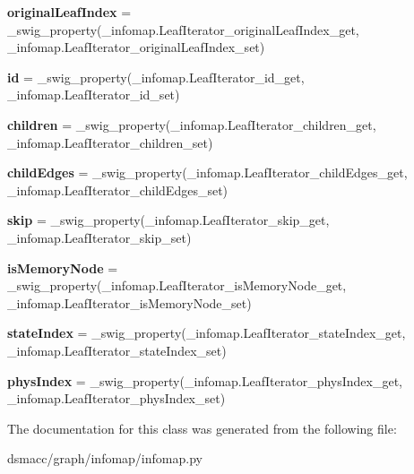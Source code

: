 \begin{DoxyCompactItemize}
{\bfseries original\+Leaf\+Index} = \+\_\+swig\+\_\+property(\+\_\+infomap.\+Leaf\+Iterator\+\_\+original\+Leaf\+Index\+\_\+get, \+\_\+infomap.\+Leaf\+Iterator\+\_\+original\+Leaf\+Index\+\_\+set)
\item 
\mbox{\label{classdsmacc_1_1graph_1_1infomap_1_1infomap_1_1LeafIterator_aa2c80b4e737f7fbe4ff70a4518a10e2d}} 
{\bfseries id} = \+\_\+swig\+\_\+property(\+\_\+infomap.\+Leaf\+Iterator\+\_\+id\+\_\+get, \+\_\+infomap.\+Leaf\+Iterator\+\_\+id\+\_\+set)
\item 
\mbox{\label{classdsmacc_1_1graph_1_1infomap_1_1infomap_1_1LeafIterator_a34543f22294e56a5c310ca7d097b70f2}} 
{\bfseries children} = \+\_\+swig\+\_\+property(\+\_\+infomap.\+Leaf\+Iterator\+\_\+children\+\_\+get, \+\_\+infomap.\+Leaf\+Iterator\+\_\+children\+\_\+set)
\item 
\mbox{\label{classdsmacc_1_1graph_1_1infomap_1_1infomap_1_1LeafIterator_a75c98301623a2fe4ce4fbd9fe1feff08}} 
{\bfseries child\+Edges} = \+\_\+swig\+\_\+property(\+\_\+infomap.\+Leaf\+Iterator\+\_\+child\+Edges\+\_\+get, \+\_\+infomap.\+Leaf\+Iterator\+\_\+child\+Edges\+\_\+set)
\item 
\mbox{\label{classdsmacc_1_1graph_1_1infomap_1_1infomap_1_1LeafIterator_ad1a9fed8ec99c30be5a41c7152352e5f}} 
{\bfseries skip} = \+\_\+swig\+\_\+property(\+\_\+infomap.\+Leaf\+Iterator\+\_\+skip\+\_\+get, \+\_\+infomap.\+Leaf\+Iterator\+\_\+skip\+\_\+set)
\item 
\mbox{\label{classdsmacc_1_1graph_1_1infomap_1_1infomap_1_1LeafIterator_a7ed59c932d7d42e54e3c9fd0d3abd1a9}} 
{\bfseries is\+Memory\+Node} = \+\_\+swig\+\_\+property(\+\_\+infomap.\+Leaf\+Iterator\+\_\+is\+Memory\+Node\+\_\+get, \+\_\+infomap.\+Leaf\+Iterator\+\_\+is\+Memory\+Node\+\_\+set)
\item 
\mbox{\label{classdsmacc_1_1graph_1_1infomap_1_1infomap_1_1LeafIterator_a026abd2e8baf55ba0517135bbea2ab46}} 
{\bfseries state\+Index} = \+\_\+swig\+\_\+property(\+\_\+infomap.\+Leaf\+Iterator\+\_\+state\+Index\+\_\+get, \+\_\+infomap.\+Leaf\+Iterator\+\_\+state\+Index\+\_\+set)
\item 
\mbox{\label{classdsmacc_1_1graph_1_1infomap_1_1infomap_1_1LeafIterator_ac315e230d8f39b1506e68d5a66d58a19}} 
{\bfseries phys\+Index} = \+\_\+swig\+\_\+property(\+\_\+infomap.\+Leaf\+Iterator\+\_\+phys\+Index\+\_\+get, \+\_\+infomap.\+Leaf\+Iterator\+\_\+phys\+Index\+\_\+set)
\end{DoxyCompactItemize}


The documentation for this class was generated from the following file\+:\begin{DoxyCompactItemize}
\item 
dsmacc/graph/infomap/infomap.\+py\end{DoxyCompactItemize}

